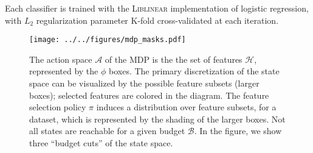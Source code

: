 Each classifier is trained with the \textsc{Liblinear} implementation of logistic regression, with $L_2$ regularization parameter K-fold cross-validated at each iteration.

\begin{figure}[t]
\centering
\texttt{[image: ../../figures/mdp\_masks.pdf]}
\caption{
The action space $\mathcal{A}$ of the MDP is the the set of features $\mathcal{H}$, represented by the $\phi$ boxes.
The primary discretization of the state space can be visualized by the possible feature subsets (larger boxes); selected features are colored in the diagram.
The feature selection policy $\pi$ induces a distribution over feature subsets, for a dataset, which is represented by the shading of the larger boxes.
Not all states are reachable for a given budget $\mathcal{B}$.
In the figure, we show three ``budget cuts'' of the state space.
\label{fig:state_space}
}
\end{figure}
